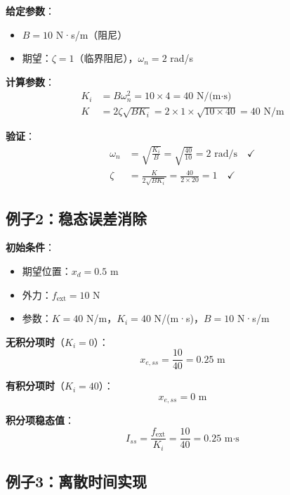 \documentclass[12pt,a4paper]{article}
\begin{document}
\textbf{给定参数}：
\begin{itemize}
\item $B = 10$ N·s/m（阻尼）
\item 期望：$\zeta = 1$（临界阻尼），$\omega_n = 2$ rad/s
\end{itemize}

\textbf{计算参数}：
\begin{align}
K_i &= B\omega_n^2 = 10 \times 4 = 40 \text{ N/(m·s)} \\
K &= 2\zeta\sqrt{BK_i} = 2 \times 1 \times \sqrt{10 \times 40} = 40 \text{ N/m}
\end{align}

\textbf{验证}：
\begin{align}
\omega_n &= \sqrt{\frac{K_i}{B}} = \sqrt{\frac{40}{10}} = 2 \text{ rad/s} \quad \checkmark \\
\zeta &= \frac{K}{2\sqrt{BK_i}} = \frac{40}{2 \times 20} = 1 \quad \checkmark
\end{align}

\subsection{例子2：稳态误差消除}

\textbf{初始条件}：
\begin{itemize}
\item 期望位置：$x_d = 0.5$ m
\item 外力：$f_{\text{ext}} = 10$ N
\item 参数：$K = 40$ N/m，$K_i = 40$ N/(m·s)，$B = 10$ N·s/m
\end{itemize}

\textbf{无积分项时}（$K_i = 0$）：
\begin{equation}
x_{e,ss} = \frac{10}{40} = 0.25 \text{ m}
\end{equation}

\textbf{有积分项时}（$K_i = 40$）：
\begin{equation}
x_{e,ss} = 0 \text{ m}
\end{equation}

\textbf{积分项稳态值}：
\begin{equation}
I_{ss} = \frac{f_{\text{ext}}}{K_i} = \frac{10}{40} = 0.25 \text{ m·s}
\end{equation}

\subsection{例子3：离散时间实现}
\end{document}
